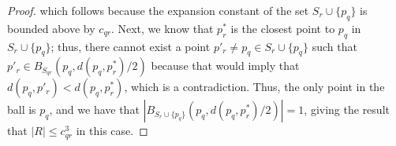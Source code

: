 \begin{proof}
\noindent which follows because the expansion constant of the set $S_r \cup \{
p_q \}$ is bounded above by $c_{qr}$.  Next, we know that $p_r^*$ is the closest
point to $p_q$ in $S_r \cup \{ p_q \}$; thus, there cannot exist a point $p'_r
\ne p_q \in S_r \cup \{ p_q \}$ such that
$p'_r \in B_{S_{qr}}(p_q, d(p_q, p_r^*) / 2)$
because that would imply that $d(p_q, p'_r) < d(p_q, p_r^*)$, which is
a contradiction.  Thus, the only point in the ball is $p_q$, and we have that $|
B_{S_r \cup \{ p_q \}}(p_q, d(p_q, p_r^*) / 2) | = 1$, giving the result that
$|R| \le c_{qr}^3$ in this case.








\end{proof}
